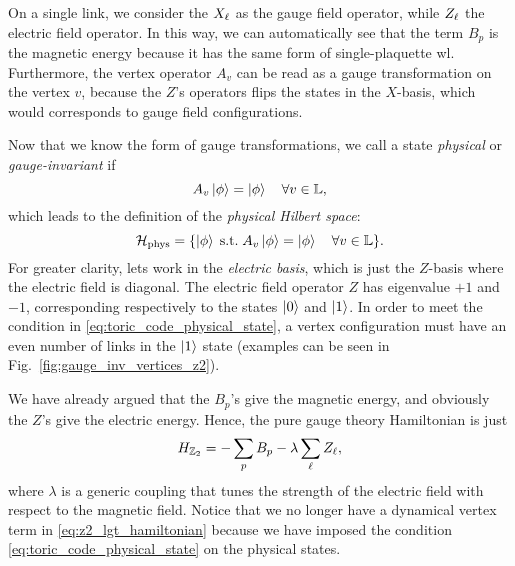 On a single link, we consider the $X_{\ell}$ as the gauge field operator, while $Z_{\ell}$ the electric field operator.
In this way, we can automatically see that the term $B_p$ is the magnetic energy because it has the same form of single-plaquette \ac{wl}.
Furthermore, the vertex operator $A_v$ can be read as a gauge transformation on the vertex $v$, because the $Z$'s operators flips the states in the $X$-basis, which would corresponds to gauge field configurations.

Now that we know the form of gauge transformations, we call a state \emph{physical} or \emph{gauge-invariant} if
\begin{equation}
    A_v \ket{\phi} = \ket{\phi} \quad \forall v \in \mathbb{L},
    \label{eq:toric_code_physical_state}
\end{equation}
which leads to the definition of the \emph{physical Hilbert space}:
\begin{equation}
    \mathcal{H}_{\text{phys}} = \{\ket{\phi} \; \text{s.t.} \; A_v \ket{\phi} = \ket{\phi} \quad \forall v \in \mathbb{L}\}.
    \label{eq:phys_Hilbert_space_toric}
\end{equation}
For greater clarity, lets work in the \emph{electric basis}, which is just the $Z$-basis where the electric field is diagonal.
The electric field operator $Z$ has eigenvalue $+1$ and $-1$, corresponding respectively to the states $\ket{0}$ and $\ket{1}$.
In order to meet the condition in \eqref{eq:toric_code_physical_state}, a vertex configuration must have an even number of links in the $\ket{1}$ state (examples can be seen in Fig.~\ref{fig:gauge_inv_vertices_z2}).

\begin{figure}[t]
\end{figure}

We have already argued that the $B_p$'s give the magnetic energy, and obviously the $Z$'s give the electric energy.
Hence, the pure gauge theory Hamiltonian is just
\begin{equation}
    H_{\mathbb{Z}_2} = - \sum_{p} B_p - \lambda \sum_{\ell} Z_{\ell},
    \label{eq:z2_lgt_hamiltonian}
\end{equation}
where $\lambda$ is a generic coupling that tunes the strength of the electric field with respect to the magnetic field.
Notice that we no longer have a dynamical vertex term in \eqref{eq:z2_lgt_hamiltonian} because we have imposed the condition \eqref{eq:toric_code_physical_state} on the physical states.


